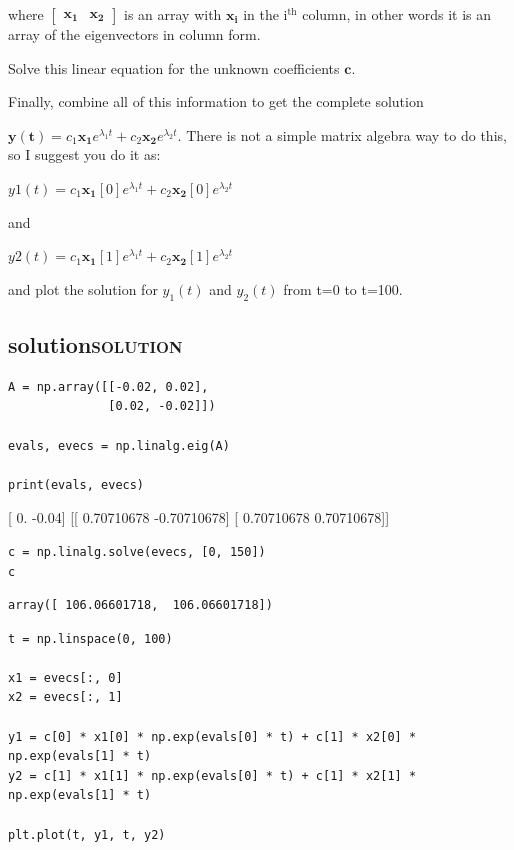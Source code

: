 \documentclass[11pt]{article}
\begin{document}
where \([\begin{array}{cc}\mathbf{x_1} & \mathbf{x_2}\end{array}]\) is an array with \(\mathbf{x_i}\) in the i\(^{\text{th}}\) column, in other words it is an array of the eigenvectors in column form.

Solve this linear equation for the unknown coefficients \(\mathbf{c}\).

Finally, combine all of this information to get the complete solution

\(\mathbf{y(t)} = c_1 \mathbf{x_1} e^{\lambda_1 t} + c_2 \mathbf{x_2} e^{\lambda_2 t}\). There is not a simple matrix algebra way to do this, so I suggest you do it as:

\(y1(t) = c_1 \mathbf{x_1}[0] e^{\lambda_1 t} + c_2 \mathbf{x_2}[0] e^{\lambda_2 t}\)

and

\(y2(t) = c_1 \mathbf{x_1}[1] e^{\lambda_1 t} + c_2 \mathbf{x_2}[1] e^{\lambda_2 t}\)


and plot the solution for \(y_1(t)\) and \(y_2(t)\) from t=0 to t=100.

\subsection{solution\hfill{}\textsc{solution}}
\label{sec:orgedd7b79}

\begin{verbatim}
A = np.array([[-0.02, 0.02],
              [0.02, -0.02]])

evals, evecs = np.linalg.eig(A)

print(evals, evecs)
\end{verbatim}

[ 0.   -0.04] [[ 0.70710678 -0.70710678]
 [ 0.70710678  0.70710678]]

\begin{verbatim}
c = np.linalg.solve(evecs, [0, 150])
c
\end{verbatim}

\begin{verbatim}
array([ 106.06601718,  106.06601718])
\end{verbatim}

\begin{verbatim}
t = np.linspace(0, 100)

x1 = evecs[:, 0]
x2 = evecs[:, 1]

y1 = c[0] * x1[0] * np.exp(evals[0] * t) + c[1] * x2[0] * np.exp(evals[1] * t)
y2 = c[1] * x1[1] * np.exp(evals[0] * t) + c[1] * x2[1] * np.exp(evals[1] * t)

plt.plot(t, y1, t, y2)
\end{verbatim}
\end{document}
